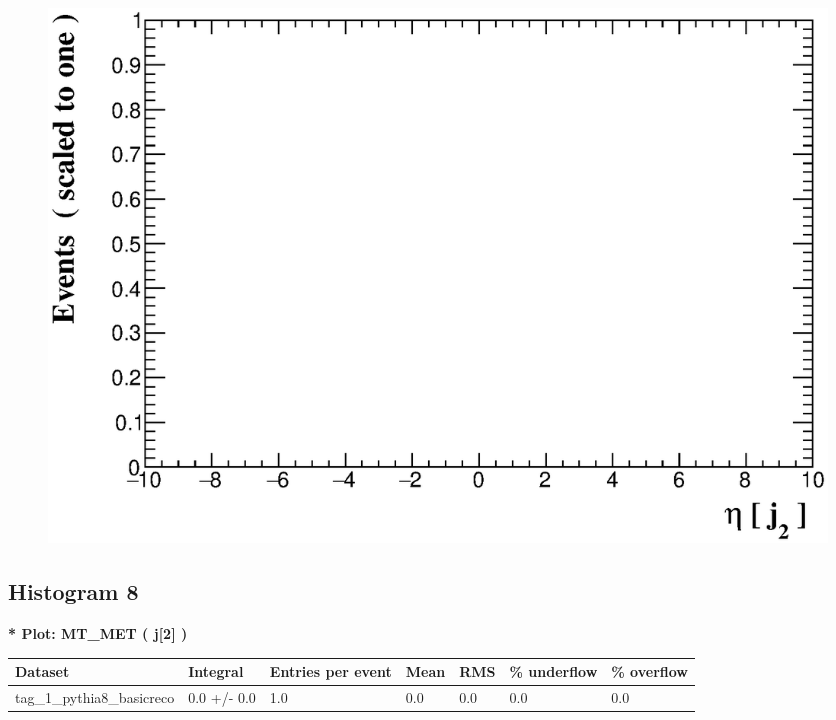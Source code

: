 \documentclass[a4paper, 10pt]{article}
\begin{document}
\begin{figure}[H]
  \begin{center}
    \includegraphics[scale=0.45]{selection_6.eps}\\
\caption{   }
  \end{center}
\end{figure}
      \newpage
\subsection{ Histogram 8}

\textbf{* Plot: MT\_MET ( j[2] ) }\\
   \begin{table}[H]
  \begin{center}
    \begin{tabular}{|m{23.0mm}|m{23.0mm}|m{18.0mm}|m{19.0mm}|m{19.0mm}|m{19.0mm}|m{19.0mm}|}
      \hline
      {\cellcolor{yellow}         Dataset}& {\cellcolor{yellow}         Integral}& {\cellcolor{yellow}         Entries per event}& {\cellcolor{yellow}         Mean}& {\cellcolor{yellow}         RMS}& {\cellcolor{yellow}         \% underflow}& {\cellcolor{yellow}         \% overflow}\\
      \hline
      {\cellcolor{white}         tag\_1\_pythia8\_basicreco}& {\cellcolor{white}         0.0 +/\-- 0.0}& {\cellcolor{white}         1.0}& {\cellcolor{white}         0.0}& {\cellcolor{white}         0.0}& {\cellcolor{green}         0.0}& {\cellcolor{green}         0.0}\\
\hline
    \end{tabular}
  \end{center}
\end{table}
\end{document}
